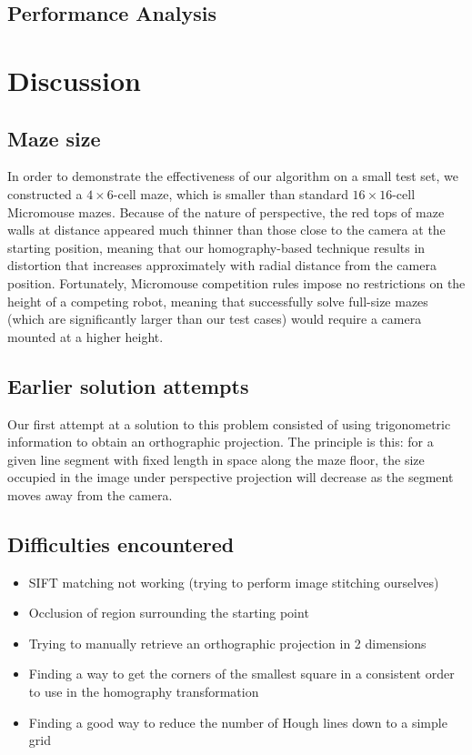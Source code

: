 \documentclass[10pt,twocolumn,letterpaper]{article}
\begin{document}


\subsection{Performance Analysis} %
\label{sub:performance_analysis}

\section{Discussion}
\label{sec:discussion}
\subsection{Maze size} %
\label{sub:maze_size}

In order to demonstrate the effectiveness of our algorithm on a small test set, we constructed a $4\times 6$-cell maze,
which is smaller than standard $16\times 16$-cell Micromouse mazes.  Because of the nature of perspective, the red tops
of maze walls at distance appeared much thinner than those close to the camera at the starting position, meaning that
our homography-based technique results in distortion that increases approximately with radial distance from the camera
position.  Fortunately, Micromouse competition rules impose no restrictions on the height of a competing robot, meaning
that successfully solve full-size mazes (which are significantly larger than our test cases) would require a camera
mounted at a higher height.

\subsection{Earlier solution attempts}
\label{sub:earlierattempts}

Our first attempt at a solution to this problem consisted of using trigonometric information to obtain an orthographic
projection.  The principle is this: for a given line segment with fixed length in space along the maze floor, the size
occupied in the image under perspective projection will decrease as the segment moves away from the camera.

\subsection{Difficulties encountered}
\label{sub:difficulties}
\begin{itemize}
	\item SIFT matching not working (trying to perform image stitching ourselves)
	\item Occlusion of region surrounding the starting point
	\item Trying to manually retrieve an orthographic projection in 2 dimensions
	\item Finding a way to get the corners of the smallest square in a consistent order to use in the homography
	transformation
	\item Finding a good way to reduce the number of Hough lines down to a simple grid
\end{itemize}
\end{document}

